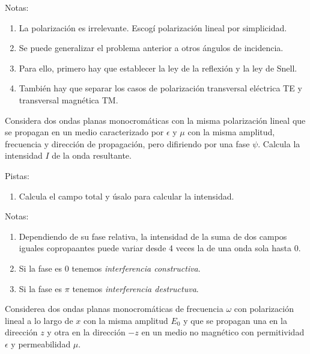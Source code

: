 \documentclass{exam}
\newenvironment{pistas}{\par\noindent Pistas:\begin{enumerate}} {\end{enumerate}}
\newenvironment{notas}{\par\noindent Notas:\begin{enumerate}} {\end{enumerate}}
\begin{document}
\begin{questions}
  \begin{notas}
  \item La polarización es irrelevante. Escogí polarización lineal por
    simplicidad.
  \item Se puede generalizar el problema anterior a otros ángulos de
    incidencia.
  \item Para ello, primero hay que establecer la ley de la reflexión y
    la ley de Snell.
  \item También hay que separar los casos de polarización transversal
    eléctrica TE y transversal magnética TM.
  \end{notas}
\question\label{h} Considera dos ondas planas monocromáticas con la
  misma polarización lineal que se propagan en un medio caracterizado
  por $\epsilon$ y $\mu$ con la misma amplitud, frecuencia y dirección
  de propagación, pero difiriendo por una fase $\psi$. Calcula la
  intensidad $I$ de la onda resultante.
  \begin{pistas}
  \item Calcula el campo total y úsalo para calcular la intensidad.
  \end{pistas}
  \begin{notas}
  \item Dependiendo de su fase relativa, la intensidad de la suma de
    dos campos iguales copropaantes puede variar desde 4 veces la de
    una onda sola hasta 0.
  \item Si la fase es 0 tenemos {\em interferencia constructiva}.
  \item Si la fase es $\pi$ tenemos {\em interferencia destructuva}.
  \end{notas}

\question\label{i} Considerea dos ondas planas monocromáticas de
  frecuencia $\omega$ con polarización lineal a lo largo de $x$ con la
  misma amplitud $E_0$ y que se propagan una en la dirección $z$ y otra en
  la dirección $-z$ en un medio no magnético con permitividad
  $\epsilon$ y permeabilidad $\mu$.
\end{questions}
\end{document}
